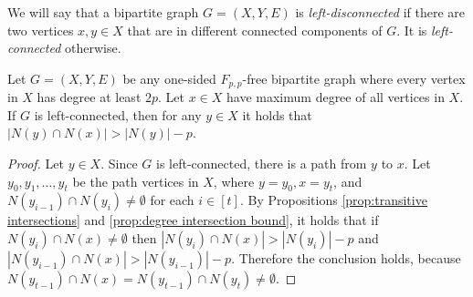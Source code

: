 \documentclass{theoretics}
\begin{document}
We will say that a bipartite graph $G = (X,Y,E)$ is \emph{left-disconnected} if there are two
vertices $x,y \in X$ that are in different connected components of $G$. It is \emph{left-connected} otherwise.

\begin{proposition}
\label{prop:highest degree connected}
Let $G = (X,Y,E)$ be any one-sided $F_{p,p}$-free bipartite graph where every vertex in $X$ has degree at least $2p$. Let $x \in X$ have maximum degree of all vertices in $X$. If $G$ is left-connected, then for any $y \in X$ it holds that $|N(y) \cap N(x)| > |N(y)|-p$.
\end{proposition}
\begin{proof}
Let $y \in X$. Since $G$ is left-connected, there is a path from $y$ to $x$. Let $y_0,y_1,\dotsc,y_t$ be
the path vertices in $X$, where $y=y_0,x=y_t$, and $N(y_{i-1}) \cap N(y_i) \neq \emptyset$ for each
$i \in [t]$. By Propositions \ref{prop:transitive intersections} and \ref{prop:degree intersection
bound}, it holds that if $N(y_i) \cap N(x) \neq \emptyset$ then $|N(y_i) \cap N(x)| > |N(y_i)|-p$
and $|N(y_{i-1}) \cap N(x)| > |N(y_{i-1})|-p$. Therefore the conclusion holds, because $N(y_{t-1})
\cap N(x) = N(y_{t-1}) \cap N(y_t) \neq \emptyset$.
\end{proof}
\end{document}
